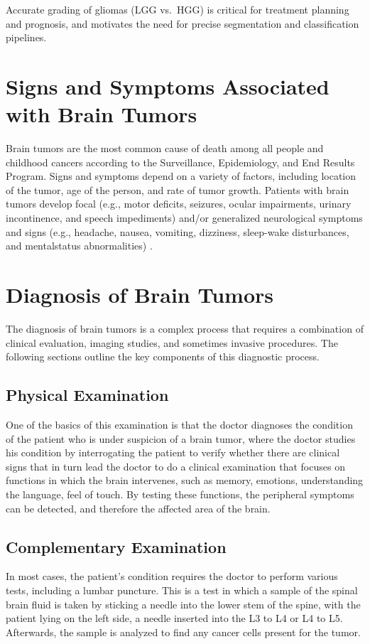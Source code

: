 Accurate grading of gliomas (LGG vs.\ HGG) is critical for treatment planning and prognosis, and motivates the need for precise segmentation and classification pipelines.


\section{Signs and Symptoms Associated with Brain Tumors}
Brain tumors are the most common cause of death among all people and childhood cancers according to the Surveillance, Epidemiology,
and End Results Program. Signs and symptoms depend on a variety
of factors, including location of the tumor, age of the person, and rate
of tumor growth. Patients with brain tumors develop focal (e.g., motor
deficits, seizures, ocular impairments, urinary incontinence, and speech
impediments) and/or generalized neurological symptoms and signs (e.g.,
headache, nausea, vomiting, dizziness, sleep-wake disturbances, and mentalstatus abnormalities) \cite{ref9}.

\section{Diagnosis of Brain Tumors}
\label{sec:diagnosis-brain-tumors}
The diagnosis of brain tumors is a complex process that requires a combination of clinical evaluation, imaging studies, and sometimes invasive procedures. The following sections outline the key components of this diagnostic process.
\subsection{Physical Examination}
One of the basics of this examination is that the doctor diagnoses the condition of the patient who is under suspicion of a brain tumor, where the doctor studies his condition by interrogating the patient to verify whether there are clinical signs that in turn lead the doctor to do a clinical examination that focuses on functions in which the brain intervenes, such as memory, emotions, understanding the language, feel of touch. By testing these functions, the peripheral symptoms can be detected, and therefore the affected area of the brain.

\subsection{Complementary Examination}
In most cases, the patient's condition requires the doctor to perform various tests, including a lumbar puncture. This is a test in which a sample of the spinal brain fluid is taken by sticking a needle into the lower stem of the spine, with the patient lying on the left side, a needle inserted into the L3 to L4 or L4 to L5. Afterwards, the sample is analyzed to find any cancer cells present for the tumor.

